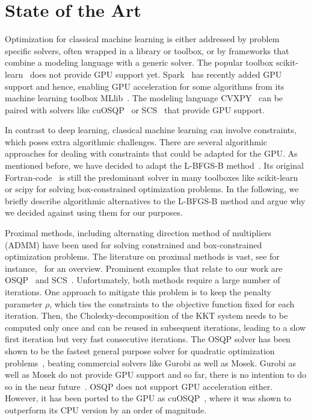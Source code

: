 \documentclass[letterpaper]{article} %
\begin{document}
\section{State of the Art}

Optimization for classical machine learning is either addressed by problem specific solvers, often wrapped in a library or toolbox, or by frameworks that combine a modeling language with a generic solver. The popular toolbox scikit-learn~\cite{scikit-learn} does not provide GPU support yet. %
Spark~\cite{ZahariaXWDADMRV16} has recently added GPU support and hence, enabling GPU acceleration for some algorithms from its machine learning toolbox MLlib~\cite{mllib}. The modeling language CVXPY~\cite{AgrawalVDB18, DiamondB16} can be paired with solvers like cuOSQP~\cite{SchubigerBL20} or SCS~\cite{ocpb:16, scs} that provide GPU support.

In contrast to deep learning, classical machine learning can involve constraints, which poses extra algorithmic challenges. There are several algorithmic approaches for dealing with constraints that could be adapted for the GPU. As mentioned before, we have decided to adapt the \mbox{L-BFGS-B} method~\cite{ByrdLNZ95}. Its original Fortran-code~\cite{ZhuBLN97} is still the predominant solver in many toolboxes like scikit-learn or scipy for solving box-constrained optimization problems. In the following, we briefly describe algorithmic alternatives to the L-BFGS-B method and argue why we decided against using them for our purposes.

Proximal methods, including alternating direction method of multipliers (ADMM) have been used for solving constrained and box-constrained optimization problems. The literature on proximal methods is vast, see for instance,~\cite{boydADMM, ParikhB14} for an overview. Prominent examples that relate to our work are OSQP~\cite{StellatoBGBB20} and SCS~\cite{ocpb:16, scs}. Unfortunately, both methods require a large number of iterations. One approach to mitigate this problem is to keep the penalty parameter $\rho$, which ties the constraints to the objective function fixed for each iteration. Then, the Cholesky-decomposition of the KKT system needs to be computed only once and can be reused in subsequent iterations, leading to a slow first iteration but very fast consecutive iterations. %
The OSQP solver has been shown to be the fastest general purpose solver for quadratic optimization problems~\cite{StellatoBGBB20}, beating commercial solvers like Gurobi as well as Mosek. Gurobi as well as Mosek do not provide GPU support and so far, there is no intention to do so in the near future~\cite{gurobi}. OSQP does not support GPU acceleration either. However, it has been ported to the GPU as cuOSQP~\cite{SchubigerBL20}, where it was shown to outperform its CPU version by an order of magnitude.
\end{document}

